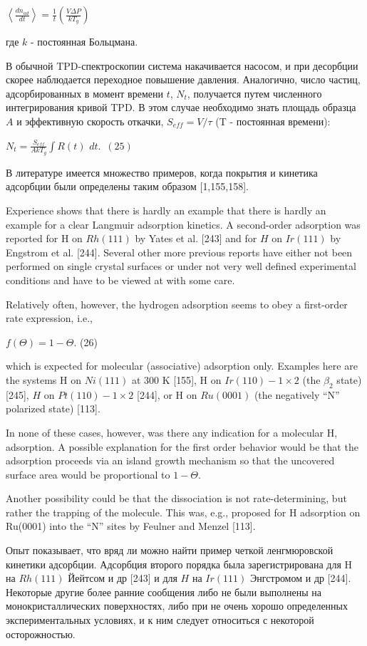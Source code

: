 \documentclass[11pt]{article}
\begin{document}
\(\left<\frac{d n_{ad}}{d t}\right> = \frac{1}{t}\left(\frac{V \Delta P}{k T_g}\right)\)

где \(k\) - постоянная Больцмана.

В обычной TPD-спектроскопии система накачивается насосом, и при
десорбции скорее наблюдается переходное повышение давления. Аналогично,
число частиц, адсорбированных в момент времени \(t\), \(N_t\),
получается путем численного интегрирования кривой TPD. В этом случае
необходимо знать площадь образца \(A\) и эффективную скорость откачки,
\(S_{eff} = V/\tau\) (T - постоянная времени):

\(N_t = \frac{S_{eff}}{A k T_g} \int R(t) \,\, dt. \,\,\,(25)\)

В литературе имеется множество примеров, когда покрытия и кинетика
адсорбции были определены таким образом {[}1,155,158{]}.

    Experience shows that there is hardly an example that there is hardly an
example for a clear Langmuir adsorption kinetics. A second-order
adsorption was reported for H on \(Rh(111)\) by Yates et al. {[}243{]}
and for \(H\) on \(Ir(111)\) by Engstrom et al. {[}244{]}. Several other
more previous reports have either not been performed on single crystal
surfaces or under not very well defined experimental conditions and have
to be viewed at with some care.

Relatively often, however, the hydrogen adsorption seems to obey a
first-order rate expression, i.e.,

\(f\left(\Theta\right) = 1 - \Theta\). (26)

which is expected for molecular (associative) adsorption only. Examples
here are the systems H on \(Ni(111)\) at 300 K {[}155{]}, H on
\(Ir(110)-1 \times 2\) (the \(\beta_2\) state) {[}245{]}, \(H\) on
\(Pt(110)-1 \times 2\) {[}244{]}, or H on \(Ru(0001)\) (the negatively
``N'' polarized state) {[}113{]}.

In none of these cases, however, was there any indication for a
molecular H, adsorption. A possible explanation for the first order
behavior would be that the adsorption proceeds via an island growth
mechanism so that the uncovered surface area would be proportional to
\(1 - \Theta\).

Another possibility could be that the dissociation is not
rate-determining, but rather the trapping of the molecule. This was,
e.g., proposed for H adsorption on Ru(0001) into the ``N'' sites by
Feulner and Menzel {[}113{]}.

    Опыт показывает, что вряд ли можно найти пример четкой ленгмюровской
кинетики адсорбции. Адсорбция второго порядка была зарегистрирована для
H на \(Rh(111)\) Йейтсом и др {[}243{]} и для \(H\) на \(Ir(111)\)
Энгстромом и др {[}244{]}. Некоторые другие более ранние сообщения либо
не были выполнены на монокристаллических поверхностях, либо при не очень
хорошо определенных экспериментальных условиях, и к ним следует
относиться с некоторой осторожностью.
\end{document}
